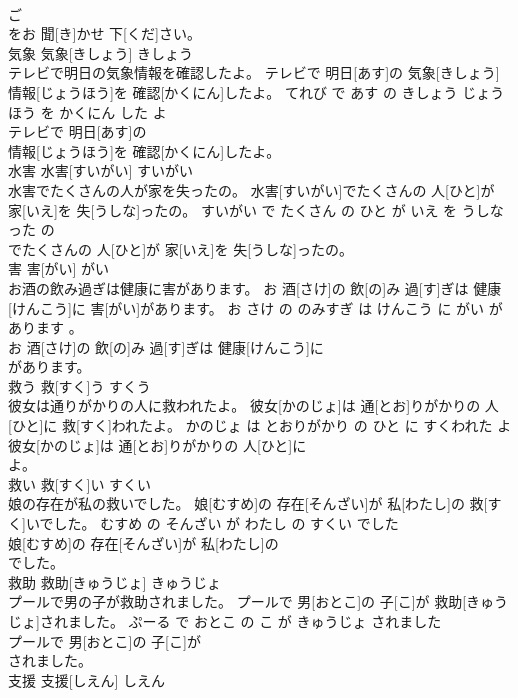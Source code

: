 \documentclass[8pt]{extreport}
\begin{document}
\begin{CJK}{UTF8}{min}
\\	ご
\\	をお 聞[き]かせ 下[くだ]さい。			
\\	気象	気象[きしょう]	きしょう	
\\	テレビで明日の気象情報を確認したよ。	テレビで 明日[あす]の 気象[きしょう] 情報[じょうほう]を 確認[かくにん]したよ。	てれび で あす の きしょう じょうほう を かくにん した よ	
\\	テレビで 明日[あす]の
\\	情報[じょうほう]を 確認[かくにん]したよ。			
\\	水害	水害[すいがい]	すいがい	
\\	水害でたくさんの人が家を失ったの。	水害[すいがい]でたくさんの 人[ひと]が 家[いえ]を 失[うしな]ったの。	すいがい で たくさん の ひと が いえ を うしなった の	
\\	でたくさんの 人[ひと]が 家[いえ]を 失[うしな]ったの。			
\\	害	害[がい]	がい	
\\	お酒の飲み過ぎは健康に害があります。	お 酒[さけ]の 飲[の]み 過[す]ぎは 健康[けんこう]に 害[がい]があります。	お さけ の のみすぎ は けんこう に がい が あります 。	
\\	お 酒[さけ]の 飲[の]み 過[す]ぎは 健康[けんこう]に
\\	があります。			
\\	救う	救[すく]う	すくう	
\\	彼女は通りがかりの人に救われたよ。	彼女[かのじょ]は 通[とお]りがかりの 人[ひと]に 救[すく]われたよ。	かのじょ は とおりがかり の ひと に すくわれた よ	
\\	彼女[かのじょ]は 通[とお]りがかりの 人[ひと]に
\\	よ。			
\\	救い	救[すく]い	すくい	
\\	娘の存在が私の救いでした。	娘[むすめ]の 存在[そんざい]が 私[わたし]の 救[すく]いでした。	むすめ の そんざい が わたし の すくい でした	
\\	娘[むすめ]の 存在[そんざい]が 私[わたし]の
\\	でした。			
\\	救助	救助[きゅうじょ]	きゅうじょ	
\\	プールで男の子が救助されました。	プールで 男[おとこ]の 子[こ]が 救助[きゅうじょ]されました。	ぷーる で おとこ の こ が きゅうじょ されました	
\\	プールで 男[おとこ]の 子[こ]が
\\	されました。			
\\	支援	支援[しえん]	しえん	

\end{CJK}
\end{document}
